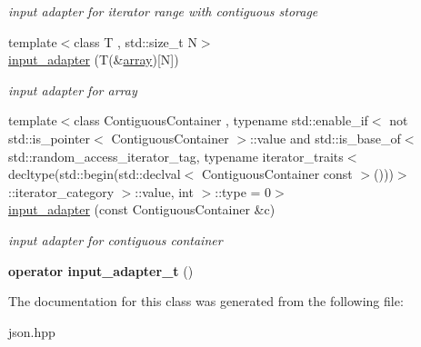 \begin{DoxyCompactItemize}
\begin{DoxyCompactList}\small\item\em input adapter for iterator range with contiguous storage \end{DoxyCompactList}\item 
\mbox{\label{classnlohmann_1_1detail_1_1input__adapter_aa2392138bf8307df1994dc7eb22d51ce}} 
{\footnotesize template$<$class T , std\+::size\+\_\+t N$>$ }\\\mbox{\hyperlink{classnlohmann_1_1detail_1_1input__adapter_aa2392138bf8307df1994dc7eb22d51ce}{input\+\_\+adapter}} (T(\&\mbox{\hyperlink{namespacenlohmann_1_1detail_a1ed8fc6239da25abcaf681d30ace4985af1f713c9e000f5d3f280adbd124df4f5}{array}})\mbox{[}N\mbox{]})
\begin{DoxyCompactList}\small\item\em input adapter for array \end{DoxyCompactList}\item 
\mbox{\label{classnlohmann_1_1detail_1_1input__adapter_a6f92fe82cb49a508dbfb297c5630cc7f}} 
{\footnotesize template$<$class Contiguous\+Container , typename std\+::enable\+\_\+if$<$ not std\+::is\+\_\+pointer$<$ Contiguous\+Container $>$\+::value and std\+::is\+\_\+base\+\_\+of$<$ std\+::random\+\_\+access\+\_\+iterator\+\_\+tag, typename iterator\+\_\+traits$<$ decltype(std\+::begin(std\+::declval$<$ Contiguous\+Container const $>$()))$>$\+::iterator\+\_\+category $>$\+::value, int $>$\+::type  = 0$>$ }\\\mbox{\hyperlink{classnlohmann_1_1detail_1_1input__adapter_a6f92fe82cb49a508dbfb297c5630cc7f}{input\+\_\+adapter}} (const Contiguous\+Container \&c)
\begin{DoxyCompactList}\small\item\em input adapter for contiguous container \end{DoxyCompactList}\item 
\mbox{\label{classnlohmann_1_1detail_1_1input__adapter_a4ef04b9490247fc38f3d1c2a9e18789b}} 
{\bfseries operator input\+\_\+adapter\+\_\+t} ()
\end{DoxyCompactItemize}


The documentation for this class was generated from the following file\+:\begin{DoxyCompactItemize}
\item 
json.\+hpp\end{DoxyCompactItemize}
